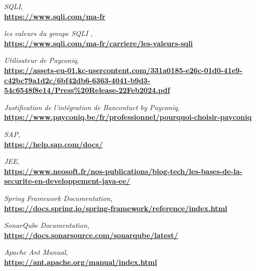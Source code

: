 
\renewcommand{\bibname}{Références}

\begin{thebibliography}{99}
    \emph{SQLI},\\
    \href{https://www.sqli.com/ma-fr}{\textbf{https://www.sqli.com/ma-fr}}
    
    \emph{les valeurs du groupe SQLI },\\
    \href{https://www.sqli.com/ma-fr/carriere/les-valeurs-sqli}{\textbf{https://www.sqli.com/ma-fr/carriere/les-valeurs-sqli}}
    
    \emph{Utilisateur de Payconiq}, \\
    \href{https://assets-eu-01.kc-usercontent.com/331a0185-e26c-01d0-41e9-c42bc79a1d2c/6bf42db6-6363-4041-b9d3-54c6548f8e14/Press%20Release-22Feb2024.pdf}{\textbf{https://assets-eu-01.kc-usercontent.com/331a0185-e26c-01d0-41e9-c42bc79a1d2c/6bf42db6-6363-4041-b9d3-54c6548f8e14/Press\%20Release-22Feb2024.pdf}}

    \emph{ Justification de l’intégration de Bancontact by Payconiq},\\
    \href{https://www.payconiq.be/fr/professionnel/pourquoi-choisir-payconiq}{\textbf{https://www.payconiq.be/fr/professionnel/pourquoi-choisir-payconiq}}

    \emph{SAP},\\
    \href{https://help.sap.com/docs/}{\textbf{https://help.sap.com/docs/}}

    \emph{JEE}, \\
    \href{https://www.neosoft.fr/nos-publications/blog-tech/les-bases-de-la-securite-en-developpement-java-ee/}{\textbf{https://www.neosoft.fr/nos-publications/blog-tech/les-bases-de-la-securite-en-developpement-java-ee/}}
   

    \emph{Spring Framework Documentation}, \\
    \href{https://docs.spring.io/spring-framework/reference/index.html}{\textbf{https://docs.spring.io/spring-framework/reference/index.html}}

    \emph{SonarQube Documentation}, \\
    \href{https://docs.sonarsource.com/sonarqube/latest/}{\textbf{https://docs.sonarsource.com/sonarqube/latest/}}

    \emph{Apache Ant Manual}, \\
    \href{https://ant.apache.org/manual/index.html}{\textbf{https://ant.apache.org/manual/index.html}}


\end{thebibliography}
